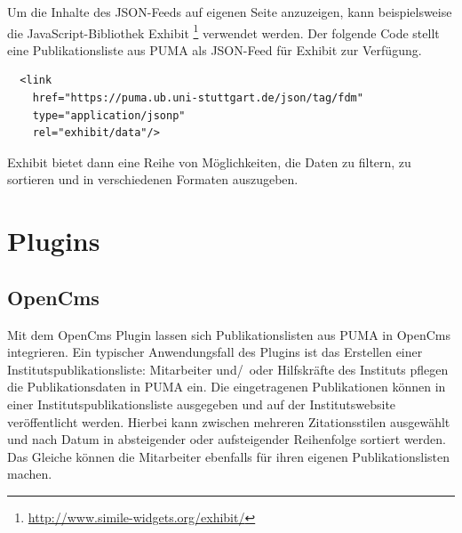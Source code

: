 Um die Inhalte des JSON-Feeds auf eigenen Seite anzuzeigen, kann beispielsweise die JavaScript-Bibliothek Exhibit \footnote{\url{http://www.simile-widgets.org/exhibit/}} verwendet werden. Der folgende Code stellt eine Publikationsliste aus PUMA als JSON-Feed für Exhibit zur Verfügung.

\lstset{language=HTML}
\begin{lstlisting}
  <link
    href="https://puma.ub.uni-stuttgart.de/json/tag/fdm"
    type="application/jsonp"
    rel="exhibit/data"/> 
\end{lstlisting}

Exhibit bietet dann eine Reihe von Möglichkeiten, die Daten zu filtern, zu sortieren und in verschiedenen Formaten auszugeben.
\section{Plugins} 
\label{sec:plugins}
\subsection{OpenCms}
\label{subsec:opencms}
Mit dem OpenCms Plugin lassen sich Publikationslisten aus PUMA in OpenCms integrieren. Ein typischer Anwendungsfall des Plugins ist das Erstellen einer Instituts\-publi\-kations\-liste: Mitarbeiter und/~oder Hilfskräfte des Instituts pflegen die Publikationsdaten in PUMA ein. Die eingetragenen Publikationen können in einer Instituts\-publi\-kations\-liste ausgegeben und auf der Instituts\-website veröffentlicht werden. Hierbei kann zwischen mehreren Zitationsstilen ausgewählt und nach Datum in absteigender oder aufsteigender Reihenfolge sortiert werden. Das Gleiche können die Mitarbeiter ebenfalls für ihren eigenen Publikationslisten machen.
